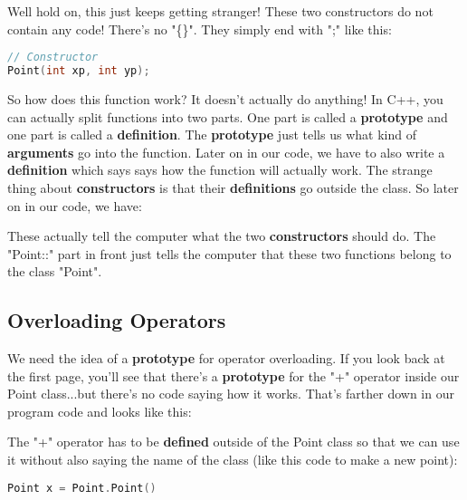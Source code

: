 \documentclass[a4paper,12pt]{article} %
\begin{document}
Well hold on, this just keeps getting stranger! These two constructors do not contain any code! There's no "\{\}". They simply end with ";" like this:

\vspace{5mm}
\begin{lstlisting}[language=C++]
// Constructor
Point(int xp, int yp);
\end{lstlisting}

\noindent
So how does this function work? It doesn't actually do anything! In C++, you can actually split functions into two parts. One part is called a \textbf{prototype} and one part is called a \textbf{definition}. The \textbf{prototype} just tells us what kind of \textbf{arguments} go into the function. Later on in our code, we have to also write a \textbf{definition} which says says how the function will actually work. The strange thing about \textbf{constructors} is that their \textbf{definitions} go outside the class. So later on in our code, we have:

\vspace{5mm}


\noindent
These actually tell the computer what the two \textbf{constructors} should do. The "Point::" part in front just tells the computer that these two functions belong to the class "Point". 

\subsection{Overloading Operators}

We need the idea of a \textbf{prototype} for operator overloading. If you look back at the first page, you'll see that there's a \textbf{prototype} for the "+" operator inside our Point class...but there's no code saying how it works. That's farther down in our program code and looks like this:

\vspace{5mm}


\noindent
The "+" operator has to be \textbf{defined} outside of the Point class so that we  can use it without also saying the name of the class (like this code to make a new point):

\vspace{5mm}
\begin{lstlisting}[language=C++]
Point x = Point.Point()
\end{lstlisting}
\end{document}

